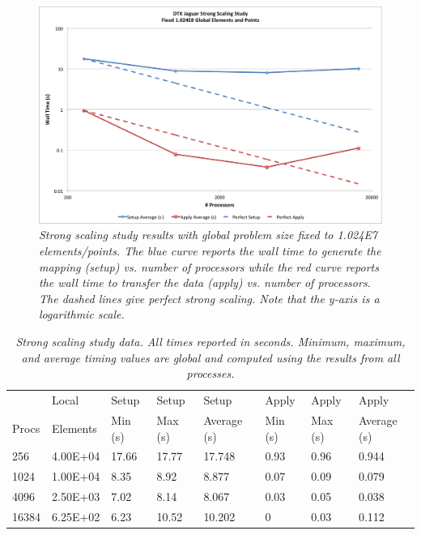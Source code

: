 \documentclass[note]{TechNote}
\begin{document}
\begin{figure}[htpb!]
  \centering
  \includegraphics[width=5.5in]{StrongScaling.png}
  \caption{\sl Strong scaling study results with global problem size
    fixed to 1.024E7 elements/points. The blue curve reports the wall
    time to generate the mapping (setup) vs. number of processors
    while the red curve reports the wall time to transfer the data
    (apply) vs. number of processors. The dashed lines give perfect
    strong scaling. Note that the y-axis is a logarithmic scale. }
  \label{fig:strong_scaling}
\end{figure}

\begin{table}[htpb!]
  \begin{center}
    \begin{tabular}{llllllll}\hline\hline
      \multicolumn{1}{l}{}& 
      \multicolumn{1}{l}{Local} & 
      \multicolumn{1}{l}{Setup} & 
      \multicolumn{1}{l}{Setup} & 
      \multicolumn{1}{l}{Setup} & 
      \multicolumn{1}{l}{Apply} & 
      \multicolumn{1}{l}{Apply} & 
      \multicolumn{1}{l}{Apply}\\
      \multicolumn{1}{l}{Procs} & 
      \multicolumn{1}{l}{Elements} & 
      \multicolumn{1}{l}{Min (s)} & 
      \multicolumn{1}{l}{Max (s)} & 
      \multicolumn{1}{l}{Average (s)} & 
      \multicolumn{1}{l}{Min (s)} & 
      \multicolumn{1}{l}{Max (s)} & 
      \multicolumn{1}{l}{Average (s)}\\ \hline\hline
256 &	4.00E+04 & 17.66 &	17.77 &	17.748 & 0.93 &	0.96 &	0.944 \\
1024 &	1.00E+04 & 8.35 &	8.92 &	8.877 &	0.07 &	0.09 &	0.079 \\
4096 &	2.50E+03 & 7.02 &	8.14 &	8.067 &	0.03 &	0.05 &	0.038 \\
16384 &	6.25E+02 & 6.23 &	10.52 &	10.202 & 0 &	0.03 &	0.112 \\
      \hline\hline
    \end{tabular}
  \end{center}
  \caption{\sl Strong scaling study data. All times reported in
    seconds. Minimum, maximum, and average timing values are global
    and computed using the results from all processes.}
  \label{tab:strong_scaling}
\end{table}
\end{document}
